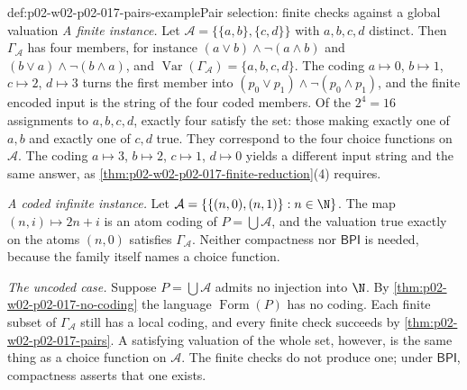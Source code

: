 \begin{hbexample}{def:p02-w02-p02-017-pairs-example}{Pair selection: finite checks against a global valuation}
\emph{A finite instance.}  Let
\(\mathcal A=\{\{a,b\},\{c,d\}\}\) with \(a,b,c,d\) distinct.  Then
\(\Gamma_{\mathcal A}\) has four members, for instance
\((a\lor b)\land\neg(a\land b)\) and
\((b\lor a)\land\neg(b\land a)\), and
\(\operatorname{Var}(\Gamma_{\mathcal A})=\{a,b,c,d\}\).  The coding
\(a\mapsto0\), \(b\mapsto1\), \(c\mapsto2\), \(d\mapsto3\) turns the first
member into \((p_0\lor p_1)\land\neg(p_0\land p_1)\), and the finite
encoded input is the string of the four coded members.  Of the
\(2^{4}=16\) assignments to \(a,b,c,d\), exactly four satisfy the set:
those making exactly one of \(a,b\) and exactly one of \(c,d\) true.
They correspond to the four choice functions on \(\mathcal A\).  The
coding \(a\mapsto3\), \(b\mapsto2\), \(c\mapsto1\), \(d\mapsto0\) yields
a different input string and the same answer, as
\cref{thm:p02-w02-p02-017-finite-reduction}(4) requires.

\emph{A coded infinite instance.}  Let
\(\mathcal A=\{\{(n,0),(n,1)\}:n\in\N\}\).  The map
\((n,i)\mapsto2n+i\) is an atom coding of \(P=\bigcup\mathcal A\), and
the valuation true exactly on the atoms \((n,0)\) satisfies
\(\Gamma_{\mathcal A}\).  Neither compactness nor \(\mathsf{BPI}\) is
needed, because the family itself names a choice function.

\emph{The uncoded case.}  Suppose \(P=\bigcup\mathcal A\) admits no
injection into \(\N\).  By \cref{thm:p02-w02-p02-017-no-coding} the
language \(\operatorname{Form}(P)\) has no coding.  Each finite subset of
\(\Gamma_{\mathcal A}\) still has a local coding, and every finite check
succeeds by \cref{thm:p02-w02-p02-017-pairs}.  A satisfying valuation of
the whole set, however, is the same thing as a choice function on
\(\mathcal A\).  The finite checks do not produce one; under
\(\mathsf{BPI}\), compactness asserts that one exists.
\end{hbexample}

